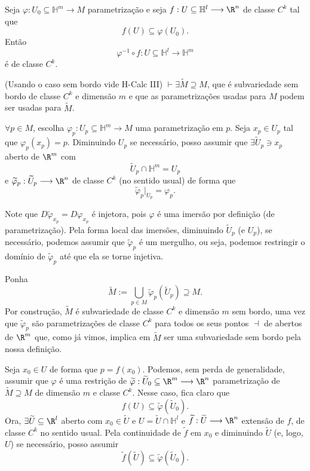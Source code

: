 \begin{lemma}\label{lemma-params}
    Seja $\varphi : U_0\subseteq\mathbb{H}^{m} \longrightarrow M$ parametrização e seja $f: U\subseteq\mathbb{H}^{l} \longrightarrow \R^{n}$ de classe $C^{k}$ tal que \[
    f\left( U \right) \subseteq\varphi \left( U_0 \right) 
    .\] Então \[
    \varphi ^{-1}\circ f : U\subseteq\mathbb{H}^{l} \longrightarrow \mathbb{H}^{m}
    \] é de classe $C^{k}$.
\end{lemma}
\begin{demo}
    (Usando o caso sem bordo vide H-Calc III) $\vdash \exists \widetilde{M} \supseteq M$, que é subvariedade sem bordo de classe $C^{k}$ e dimensão $m$ e que as parametrizações usadas para $M$ podem ser usadas para $\widetilde{M}$.

    $\forall p \in M$, escolha $\varphi _p: U_p\subseteq\mathbb{H}^{m} \longrightarrow M$ uma parametrização em $p$. Seja $x_p \in U_p$ tal que $\varphi_p \left( x_p \right) =p$. Diminuindo $U_p$ se necessário, posso assumir que $\exists \widetilde{U}_p \ni x_p$ aberto de $\R^{m}$ com \[
	\widetilde{U}_p \cap \mathbb{H}^{m} = U_p
    \] e $\widetilde{\varphi }_p: \widetilde{U}_p \longrightarrow \R^{n}$ de classe $C^{k}$ (no sentido usual) de forma que \[
    \widetilde{\varphi }_p\Big|_{U_p} = \varphi _p
    .\] 

    Note que $D \widetilde{\varphi }_{x_p} = D \varphi _{x_p}$ é injetora, pois $\varphi $ é uma imersão por definição (de parametrização). Pela forma local das imersões, diminuindo $\widetilde{U}_p$ (e $U_p$), se necessário, podemos assumir que $\widetilde{\varphi }_p$ é um mergulho, ou seja, podemos restringir o domínio de $\widetilde{\varphi }_p $ até que ela se torne injetiva.

    Ponha \[
    \widetilde{M} := \bigcup_{p \in M} \widetilde{\varphi }_p \left( \widetilde{U}_p \right) \supseteq M
    .\] Por construção, $\widetilde{M}$ é subvariedade de classe $C^{k}$ e dimensão $m$ sem bordo, uma vez que $\widetilde{\varphi }_p$ são parametrizações de classe $C^{k}$ para todos os seus pontos $\dashv$ de abertos de $\R^{m}$ que, como já vimos, implica em $\widetilde{M}$ ser uma subvariedade sem bordo pela nossa definição.

    Seja $x_0\in U$ de forma que $p=f\left( x_0 \right) $. Podemos, sem perda de generalidade, assumir que $\varphi $ é uma restrição de $\widetilde{\varphi }: \widetilde{U}_0\subseteq\R^{m} \longrightarrow \R^{n}$ parametrização de $\widetilde{M} \supseteq M$ de dimensão $m$ e classe $C^{k}$. Nesse caso, fica claro que \[
    f\left( U \right) \subseteq \widetilde{\varphi }\left( \widetilde{U}_0 \right)
.\] Ora, $\exists \widetilde{U} \subseteq\R^{l}$ aberto com $x_0 \in \widetilde{U}$ e $U = \widetilde{U} \cap \mathbb{H}^{l} $ e $\widetilde{f}: \widetilde{U} \longrightarrow \R^{n}$ extensão de $f$, de classe $C^{k}$ no sentido usual. Pela continuidade de $\widetilde{f}$ em $x_0$ e diminuindo $\widetilde{U}$ (e, logo, $U$) se necessário, posso assumir \[
    \widetilde{f}\left( \widetilde{U} \right) \subseteq \widetilde{\varphi }\left( \widetilde{U}_0 \right)
    .\]


\end{demo}
